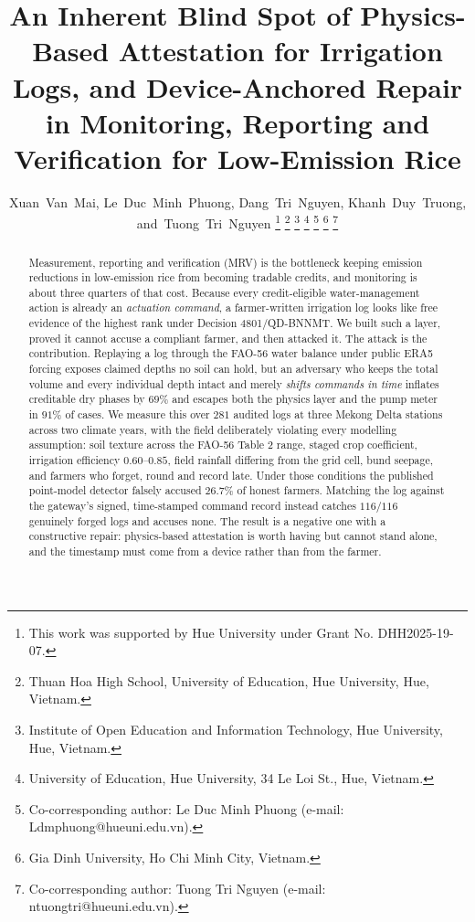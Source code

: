 \documentclass[journal]{IEEEtran}
\begin{document}
\title{An Inherent Blind Spot of Physics-Based Attestation for Irrigation Logs,
  and Device-Anchored Repair in Monitoring, Reporting and Verification for
  Low-Emission Rice}
\author{Xuan~Van~Mai,
        Le~Duc~Minh~Phuong,
        Dang~Tri~Nguyen,
        Khanh~Duy~Truong,
        and~Tuong~Tri~Nguyen%
\thanks{This work was supported by Hue University under Grant No. DHH2025-19-07.}%
\thanks{Thuan Hoa High School, University of Education, Hue University, Hue, Vietnam.}%
\thanks{Institute of Open Education and Information Technology, Hue University, Hue, Vietnam.}%
\thanks{University of Education, Hue University, 34 Le Loi St., Hue, Vietnam.}%
\thanks{Co-corresponding author: Le Duc Minh Phuong (e-mail: Ldmphuong@hueuni.edu.vn).}%
\thanks{Gia Dinh University, Ho Chi Minh City, Vietnam.}%
\thanks{Co-corresponding author: Tuong Tri Nguyen (e-mail: ntuongtri@hueuni.edu.vn).}}

\maketitle
\begin{abstract}
Measurement, reporting and verification (MRV) is the bottleneck keeping emission
reductions in low-emission rice from becoming tradable credits, and monitoring is
about three quarters of that cost. Because every credit-eligible water-management
action is already an \emph{actuation command}, a farmer-written irrigation log
looks like free evidence of the highest rank under Decision 4801/QD-BNNMT. We
built such a layer, proved it cannot accuse a compliant farmer, and then attacked
it. The attack is the contribution. Replaying a log through the FAO-56 water
balance under public ERA5 forcing exposes claimed depths no soil can hold, but
an adversary who keeps the total volume and every individual depth intact and
merely \emph{shifts commands in time} inflates creditable dry phases by
$69\%$ and escapes both the physics layer and the pump meter in $91\%$ of cases.
We measure this over $281$ audited logs at three Mekong Delta stations across two
climate years, with the field deliberately violating every modelling assumption:
soil texture across the FAO-56 Table 2 range, staged crop coefficient,
irrigation efficiency $0.60$--$0.85$, field rainfall differing from the grid
cell, bund seepage, and farmers who forget, round and record late. Under those
conditions the published point-model detector falsely accused $26.7\%$ of honest
farmers. Matching the log against the gateway's signed, time-stamped command
record instead catches $116/116$ genuinely forged logs and accuses none. The
result is a negative one with a constructive repair: physics-based attestation is
worth having but cannot stand alone, and the timestamp must come from a device
rather than from the farmer.
\end{abstract}
\end{document}
